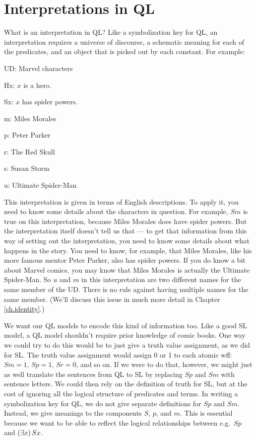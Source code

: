 \section{Interpretations in QL}

What is an interpretation in QL? Like a symbolization key for QL, an interpretation requires a universe of discourse, a schematic meaning for each of the predicates, and an object that is picked out by each constant. For example:

\begin{ekey}
\item[UD:] Marvel characters
\item[Hx:] $x$ is a hero.
\item[Sx:] $x$ has spider powers.
\item[m:] Miles Morales
\item[p:] Peter Parker
\item[r:] The Red Skull
\item[s:] Susan Storm
\item[u:] Ultimate Spider-Man
\end{ekey}

This interpretation is given in terms of English descriptions. To apply it, you need to know some details about the characters in question. For example, $Sm$ is true on this interpretation, because Miles Morales does have spider powers. But the interpretation itself doesn't tell us that --- to get that information from this way of setting out the interpretation, you need to know some details about what happens in the story. You need to know, for example, that Miles Morales, like his more famous mentor Peter Parker, also has spider powers. If you do know a bit about Marvel comics, you may know that Miles Morales is actually the Ultimate Spider-Man. So $u$ and $m$ in this interpretation are two different names for the same member of the UD. There is no rule against having multiple names for the same member. (We'll discuss this issue in much more detail in Chapter \ref{ch.identity}.)

We want our QL models to encode this kind of information too. Like a good SL model, a QL model shouldn't require prior knowledge of comic books. One way we could try to do this would be to just give a truth value assignment, as we did for SL. The truth value assignment would assign 0 or 1 to each atomic wff: $Sm=1$, $Sp=1$, $Sr=0$, and so on. If we were to do that, however, we might just as well translate the sentences from QL to SL by replacing $Sp$ and $Sm$ with sentence letters. We could then rely on the definition of truth for SL, but at the cost of ignoring all the logical structure of predicates and terms. In writing a symbolization key for QL, we do not give separate definitions for $Sp$ and $Sm$. Instead, we give meanings to the components $S$, $p$, and $m$. This is essential because we want to be able to reflect the logical relationships between e.g.\ $Sp$ and $(\exists x) \, Sx$.

